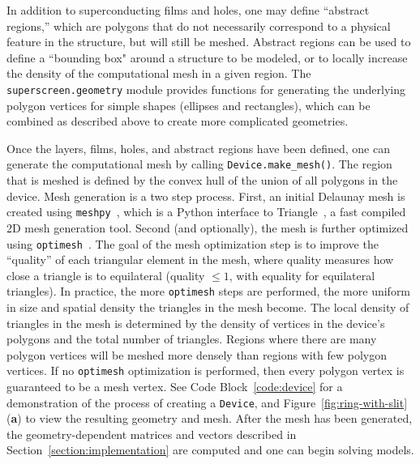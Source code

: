 \documentclass[final,3p,times,twocolumn]{elsarticle}
\newcommand{\inline}[1]{\texttt{#1}\xspace}
\begin{document}
In addition to superconducting films and holes, one may define ``abstract regions,'' which are polygons that do not necessarily correspond to a physical feature in the structure, but will still be meshed. Abstract regions can be used to define a ``bounding box" around a structure to be modeled, or to locally increase the density of the computational mesh in a given region. The \inline{superscreen.geometry} module provides functions for generating the underlying polygon vertices for simple shapes (ellipses and rectangles), which can be combined as described above to create more complicated geometries.

Once the layers, films, holes, and abstract regions have been defined, one can generate the computational mesh by calling \inline{Device.make_mesh()}. The region that is meshed is defined by the convex hull of the union of all polygons in the device. Mesh generation is a two step process. First, an initial Delaunay mesh is created using \inline{meshpy}~\cite{Klockner}, which is a Python interface to Triangle~\cite{Shewchuk1996-va, Shewchuk}, a fast compiled 2D mesh generation tool. Second (and optionally), the mesh is further optimized using \inline{optimesh}~\cite{Schlomer2021-ua}. The goal of the mesh optimization step is to improve the ``quality'' of each triangular element in the mesh, where quality measures how close a triangle is to equilateral (quality $\leq1$, with equality for equilateral triangles). In practice, the more \inline{optimesh} steps are performed, the more uniform in size and spatial density the triangles in the mesh become. The local density of triangles in the mesh is determined by the density of vertices in the device's polygons and the total number of triangles. Regions where there are many polygon vertices will be meshed more densely than regions with few polygon vertices. If no \inline{optimesh} optimization is performed, then every polygon vertex is guaranteed to be a mesh vertex. See Code Block~\ref{code:device} for a demonstration of the process of creating a \inline{Device}, and Figure~\ref{fig:ring-with-slit}({\bf a}) to view the resulting geometry and mesh. After the mesh has been generated, the geometry-dependent matrices and vectors described in Section~\ref{section:implementation} are computed and one can begin solving models.
\end{document}
